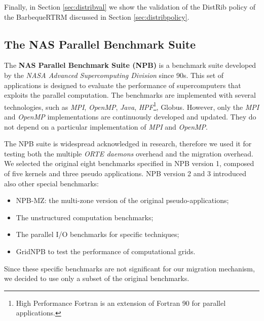 Finally, in Section \ref{sec:distribval} we show the validation of the DistRib
policy of the BarbequeRTRM discussed in Section \ref{sec:distribpolicy}.

\subsection{The NAS Parallel Benchmark Suite}
The \textbf{NAS Parallel Benchmark Suite (NPB)} \cite{bailey1991parallel} is
a benchmark suite developed by the \emph{NASA Advanced Supercomputing
Division} since 90s. This set of applications is designed to evaluate the
performance of supercomputers that exploits the parallel computation. The
benchmarks are implemented with several technologies, such as \emph{MPI},
\emph{OpenMP}, \emph{Java}, \emph{HPF}\footnote{High Performance Fortran is
an extension of Fortran 90 for parallel applications.}, Globus. However,
only the \emph{MPI} and \emph{OpenMP} implementations are continuously
developed and updated. They do not depend on a particular implementation 
of \emph{MPI} and \emph{OpenMP}.

The NPB suite is widespread acknowledged in research, therefore
we used it for testing both the multiple \emph{ORTE daemons} overhead
and the migration overhead. We selected the original eight benchmarks specified in NPB version
1, composed of five kernels and three pseudo applications. NPB version 2 and 3
introduced also other special benchmarks:
\begin{itemize}
\item NPB-MZ: the multi-zone version of the original pseudo-applications;
\item The unstructured computation benchmarks;
\item The parallel I/O benchmarks for specific techniques;
\item GridNPB to test the performance of computational grids.
\end{itemize}
Since these specific benchmarks are not significant for our migration
mechanism, we decided to use only a subset of the original benchmarks.

